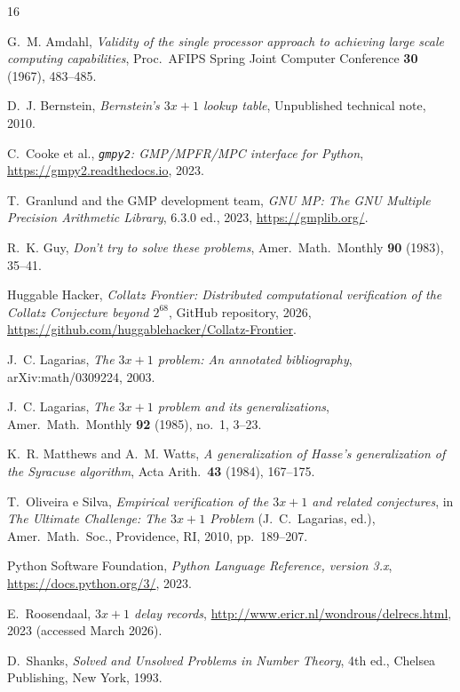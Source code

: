 \documentclass{mcom-l}
\theoremstyle{definition}
\theoremstyle{remark}
\numberwithin{equation}{section}
\begin{document}
\begin{thebibliography}{16}

G.~M. Amdahl,
\emph{Validity of the single processor approach to achieving large
  scale computing capabilities},
Proc.\ AFIPS Spring Joint Computer Conference \textbf{30} (1967),
483--485.

D.~J. Bernstein,
\emph{Bernstein's $3x{+}1$ lookup table},
Unpublished technical note, 2010.

C.~Cooke et al.,
\emph{\texttt{gmpy2}: GMP/MPFR/MPC interface for Python},
\url{https://gmpy2.readthedocs.io}, 2023.

T.~Granlund and the GMP development team,
\emph{GNU MP: The GNU Multiple Precision Arithmetic Library},
6.3.0 ed., 2023,
\url{https://gmplib.org/}.

R.~K. Guy,
\emph{Don't try to solve these problems},
Amer.\ Math.\ Monthly \textbf{90} (1983), 35--41.

Huggable Hacker,
\emph{Collatz Frontier: Distributed computational verification of the
  Collatz Conjecture beyond $2^{68}$},
GitHub repository, 2026,
\url{https://github.com/huggablehacker/Collatz-Frontier}.

J.~C. Lagarias,
\emph{The $3x{+}1$ problem: An annotated bibliography},
arXiv:math/0309224, 2003.

J.~C. Lagarias,
\emph{The $3x{+}1$ problem and its generalizations},
Amer.\ Math.\ Monthly \textbf{92} (1985), no.~1, 3--23.

K.~R. Matthews and A.~M. Watts,
\emph{A generalization of Hasse's generalization of the Syracuse
  algorithm},
Acta Arith.\ \textbf{43} (1984), 167--175.

T.~Oliveira e Silva,
\emph{Empirical verification of the $3x{+}1$ and related conjectures},
in \emph{The Ultimate Challenge: The $3x{+}1$ Problem}
(J.~C.~Lagarias, ed.),
Amer.\ Math.\ Soc., Providence, RI, 2010, pp.~189--207.

Python Software Foundation,
\emph{Python Language Reference, version 3.x},
\url{https://docs.python.org/3/}, 2023.

E.~Roosendaal,
\emph{$3x{+}1$ delay records},
\url{http://www.ericr.nl/wondrous/delrecs.html}, 2023
(accessed March 2026).

D.~Shanks,
\emph{Solved and Unsolved Problems in Number Theory},
4th ed., Chelsea Publishing, New York, 1993.


\end{thebibliography}
\end{document}
